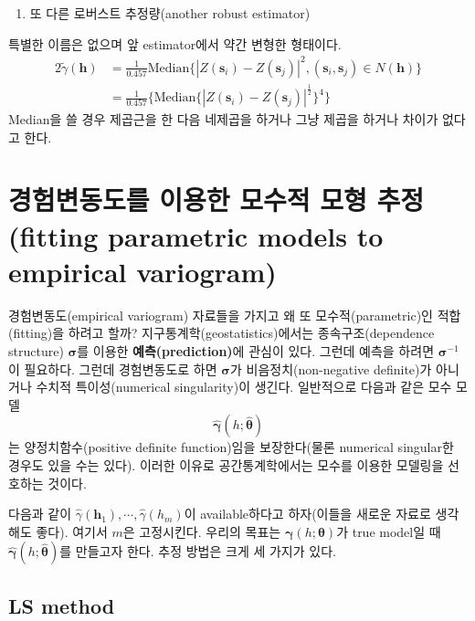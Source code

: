 \documentclass[b5paper,]{scrbook}
\providecommand{\tightlist}{%
  \setlength{\itemsep}{0pt}\setlength{\parskip}{0pt}}
\theoremstyle{plain}
\theoremstyle{definition}
\numberwithin{equation}{section}
\begin{document}
\begin{enumerate}
\def\labelenumi{\arabic{enumi}.}
\setcounter{enumi}{2}
\tightlist
\item
  또 다른 로버스트 추정량(another robust estimator)
\end{enumerate}

특별한 이름은 없으며 앞 estimator에서 약간 변형한 형태이다. \[
\begin{aligned}
2\tilde{\gamma}(\mathbf{h})&=\frac{1}{0.457}\text{Median}\{ |Z(\mathbf{s}_{i})-Z(\mathbf{s}_{j})|^{2} , (\mathbf{s}_{i},\mathbf{s}_{j})\in N(\mathbf{h}) \}\\
&=\frac{1}{0.457}\{\text{Median} \{ |Z(\mathbf{s}_{i})-Z(\mathbf{s}_{j})|^{\frac{1}{2}} \}^{4} \}
\end{aligned}
\] Median을 쓸 경우 제곱근을 한 다음 네제곱을 하거나 그냥 제곱을 하거나
차이가 없다고 한다.

\section{경험변동도를 이용한 모수적 모형 추정(fitting parametric models
to empirical
variogram)}\label{----fitting-parametric-models-to-empirical-variogram}

경험변동도(empirical variogram) 자료들을 가지고 왜 또
모수적(parametric)인 적합(fitting)을 하려고 할까?
지구통계학(geostatistics)에서는 종속구조(dependence structure)
\(\boldsymbol{\sigma}\)를 이용한 \textbf{예측(prediction)}에 관심이
있다. 그런데 예측을 하려면 \(\boldsymbol{\sigma}^{-1}\)이 필요하다.
그런데 경험변동도로 하면 \(\boldsymbol{\sigma}\)가 비음정치(non-negative
definite)가 아니거나 수치적 특이성(numerical singularity)이 생긴다.
일반적으로 다음과 같은 모수 모델
\[\hat{\boldsymbol{\gamma}}(h;\hat{\boldsymbol{\theta}})\] 는
양정치함수(positive definite function)임을 보장한다(물론 numerical
singular한 경우도 있을 수는 있다). 이러한 이유로 공간통계학에서는 모수를
이용한 모델링을 선호하는 것이다.

다음과 같이
\(\hat{\gamma}(\mathbf{h}_{1}), \cdots , \hat{\gamma}(h_{m})\)이
available하다고 하자(이들을 새로운 자료로 생각해도 좋다). 여기서 \(m\)은
고정시킨다. 우리의 목표는
\(\boldsymbol{\gamma}(h;\boldsymbol{\theta})\)가 true model일 때
\(\hat{\boldsymbol{\gamma}}(h;\hat{\boldsymbol{\theta}})\)를 만들고자
한다. 추정 방법은 크게 세 가지가 있다.

\subsection{LS method}\label{ls-method}
\end{document}
